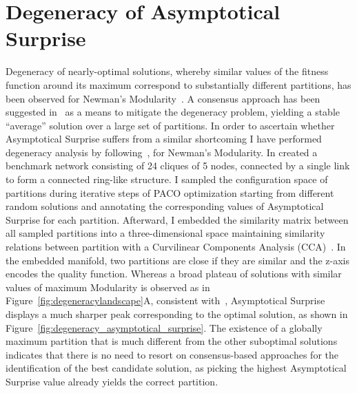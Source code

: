 \section{Degeneracy of Asymptotical Surprise}\label{sec:degeneracy_asymptotical_surprise}
Degeneracy of nearly-optimal solutions, whereby similar values of the fitness function around its maximum correspond to substantially different partitions, has been observed for Newman's Modularity~\cite{good2009}.
A consensus approach has been suggested in~\cite{lancichinetti2012} as a means to mitigate the degeneracy problem, yielding a stable ``average'' solution over a large set of partitions.
In order to ascertain whether Asymptotical Surprise suffers from a similar shortcoming I have performed degeneracy analysis by following~\cite{good2009}, for Newman's Modularity.
In created a benchmark network consisting of 24 cliques of 5 nodes, connected by a single link to form a connected ring-like structure.
I sampled the configuration space of partitions during iterative steps of PACO optimization starting from different random solutions and annotating the corresponding values of Asymptotical Surprise for each partition.
Afterward, I embedded the similarity matrix between all sampled partitions into a three-dimensional space maintaining similarity relations between partition with a Curvilinear Components Analysis (CCA)~\cite{good2009}.
In the embedded manifold, two partitions are close if they are similar and the z-axis encodes the quality function.
Whereas a broad plateau of solutions with similar values of maximum Modularity is observed as in Figure~\ref{fig:degeneracylandscape}A, consistent with~\cite{good2009}, Asymptotical Surprise displays a much sharper peak corresponding to the optimal solution, as shown in Figure~\ref{fig:degeneracy_asymptotical_surprise}.
The existence of a globally maximum partition that is much different from the other suboptimal solutions indicates that there is no need to resort on consensus-based approaches for the identification of the best candidate solution, as picking the highest Asymptotical Surprise value already yields the correct partition.

